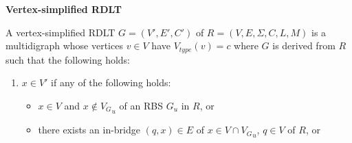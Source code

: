 \documentclass[12pt]{article}
\begin{document}
        \begin{definition} \textbf{Vertex-simplified RDLT} \cite{malinao-rdlt}

            A vertex-simplified RDLT \begin{math}G = (V',E',C')\end{math} of \begin{math} R = (V,E,\Sigma,C,L,M)\end{math} is a multidigraph whose vertices \begin{math}v \in V\end{math} have \begin{math}V_{type}(v) = c\end{math} where \begin{math}G\end{math} is derived from \begin{math}R\end{math} such that the following holds:

            \begin{enumerate}
                
                \item \begin{math}x \in V'\end{math} if any of the following holds:
                    \begin{itemize}
                        
                        \item \begin{math}x \in V\end{math} and \begin{math}x \notin {V_G}_u\end{math} of an RBS \begin{math}G_u\end{math} in \begin{math}R\end{math}, or

                        \item there exists an in-bridge \begin{math}(q,x) \in E\end{math} of \begin{math}x \in V \cap {V_G}_u\end{math}, \begin{math}q \in V\end{math} of \begin{math}R\end{math}, or


\end{itemize}
\end{enumerate}
\end{definition}
\end{document}
